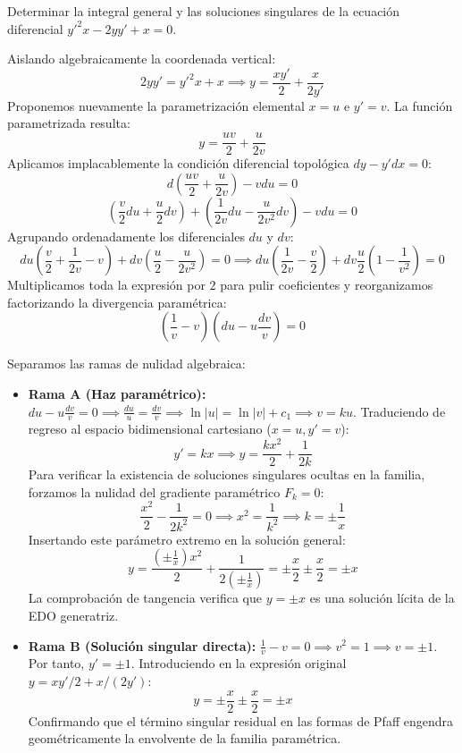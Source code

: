 \begin{ejercicio}
Determinar la integral general y las soluciones singulares de la ecuación diferencial $y'^2 x - 2yy' + x = 0$.
\end{ejercicio}

\begin{tcolorbox}
Aislando algebraicamente la coordenada vertical:
$$ 2yy' = y'^2 x + x \implies y = \frac{xy'}{2} + \frac{x}{2y'} $$
Proponemos nuevamente la parametrización elemental $x=u$ e $y'=v$. La función parametrizada resulta:
$$ y = \frac{uv}{2} + \frac{u}{2v} $$
Aplicamos implacablemente la condición diferencial topológica $dy - y'dx = 0$:
$$ d\left( \frac{uv}{2} + \frac{u}{2v} \right) - v du = 0 $$
$$ \left( \frac{v}{2}du + \frac{u}{2}dv \right) + \left( \frac{1}{2v}du - \frac{u}{2v^2}dv \right) - v du = 0 $$
Agrupando ordenadamente los diferenciales $du$ y $dv$:
$$ du\left( \frac{v}{2} + \frac{1}{2v} - v \right) + dv\left( \frac{u}{2} - \frac{u}{2v^2} \right) = 0 \implies du\left( \frac{1}{2v} - \frac{v}{2} \right) + dv \frac{u}{2}\left( 1 - \frac{1}{v^2} \right) = 0 $$
Multiplicamos toda la expresión por $2$ para pulir coeficientes y reorganizamos factorizando la divergencia paramétrica:
$$ \left( \frac{1}{v} - v \right) \left( du - u\frac{dv}{v} \right) = 0 $$

Separamos las ramas de nulidad algebraica:
\begin{itemize}
    \item \textbf{Rama A (Haz paramétrico):} $du - u\frac{dv}{v} = 0 \implies \frac{du}{u} = \frac{dv}{v} \implies \ln|u| = \ln|v| + c_1 \implies v = ku$.
    Traduciendo de regreso al espacio bidimensional cartesiano ($x=u, y'=v$):
    $$ y' = kx \implies y = \frac{kx^2}{2} + \frac{1}{2k} $$
    Para verificar la existencia de soluciones singulares ocultas en la familia, forzamos la nulidad del gradiente paramétrico $F_k = 0$:
    $$ \frac{x^2}{2} - \frac{1}{2k^2} = 0 \implies x^2 = \frac{1}{k^2} \implies k = \pm \frac{1}{x} $$
    Insertando este parámetro extremo en la solución general:
    $$ y = \frac{\left(\pm \frac{1}{x}\right)x^2}{2} + \frac{1}{2\left(\pm \frac{1}{x}\right)} = \pm \frac{x}{2} \pm \frac{x}{2} = \pm x $$
    La comprobación de tangencia verifica que $y = \pm x$ es una solución lícita de la EDO generatriz.

    \item \textbf{Rama B (Solución singular directa):} $\frac{1}{v} - v = 0 \implies v^2 = 1 \implies v = \pm 1$.
    Por tanto, $y' = \pm 1$. Introduciendo en la expresión original $y = xy'/2 + x/(2y')$:
    $$ y = \pm \frac{x}{2} \pm \frac{x}{2} = \pm x $$
    Confirmando que el término singular residual en las formas de Pfaff engendra geométricamente la envolvente de la familia paramétrica.
\end{itemize}


\end{tcolorbox}
